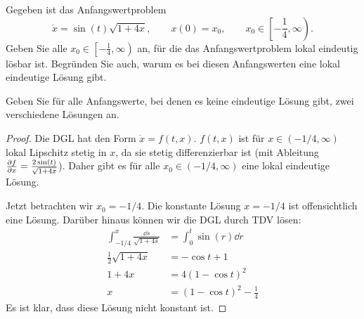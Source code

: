 \begin{Problem}
	Gegeben ist das Anfangswertproblem
	\[
		\dot{x}=\sin(t)\sqrt{1+4x} ,\qquad x(0)=x_0,\qquad x_0\in \left[ -\frac{1}{4}, \infty\right)
	.\] 
	Geben Sie alle $x_0\in \left[-\frac{1}{4},\infty\right)$ an, f\"{u}r die das Anfangswertproblem lokal eindeutig l\"{o}sbar ist. Begr\"{u}nden Sie auch, warum es bei diesen Anfangswerten eine lokal eindeutige L\"{o}sung gibt.

	Geben Sie f\"{u}r alle Anfangswerte, bei denen es keine eindeutige L\"{o}sung gibt, zwei verschiedene L\"{o}sungen an.
\end{Problem}
\begin{proof}
	Die DGL hat den Form $\dot{x}=f(t, x)$. $f(t,x)$ ist f\"{u}r $x\in (-1/4, \infty)$ lokal Lipschitz stetig in $x$, da sie stetig differenzierbar ist (mit Ableitung $\pdv{f}{x}=\frac{2\sin(t)}{\sqrt{1+4x}}$). Daher gibt es f\"{u}r alle $x_0\in (-1/4,\infty)$ eine lokal eindeutige L\"{o}sung.
	
	Jetzt betrachten wir $x_0=-1/4$. Die konstante L\"{o}sung $x=-1/4$ ist offensichtlich eine L\"{o}sung. Darüber hinaus können wir die DGL durch TDV l\"{o}sen:
	\begin{align*}
	\int_{-1/4}^x \frac{\dd{s}}{\sqrt{1+4s}}&=\int_0^t \sin(r)\dd{r}\\
	\frac{1}{2}\sqrt{1+4x}&=-\cos t + 1\\
	1+4x&=4(1-\cos t)^2\\
	x &= (1-\cos t)^2 -\frac 14
\end{align*}
Es ist klar, dass diese L\"{o}sung nicht konstant ist.
\end{proof}
